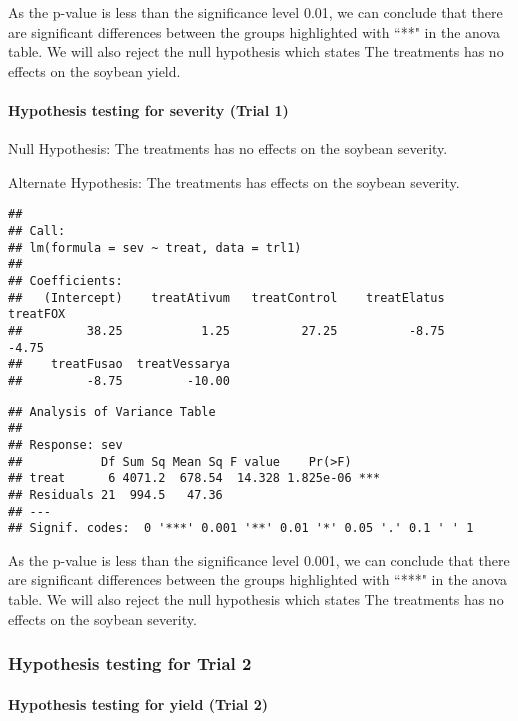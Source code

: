 \documentclass[
]{article}
\begin{document}
As the p-value is less than the significance level 0.01, we can conclude
that there are significant differences between the groups highlighted
with ``**" in the anova table. We will also reject the null hypothesis
which states The treatments has no effects on the soybean yield.

\hypertarget{hypothesis-testing-for-severity-trial-1}{%
\paragraph{Hypothesis testing for severity (Trial
1)}\label{hypothesis-testing-for-severity-trial-1}}

Null Hypothesis: The treatments has no effects on the soybean severity.

Alternate Hypothesis: The treatments has effects on the soybean
severity.

\begin{verbatim}
## 
## Call:
## lm(formula = sev ~ treat, data = trl1)
## 
## Coefficients:
##   (Intercept)    treatAtivum   treatControl    treatElatus       treatFOX  
##         38.25           1.25          27.25          -8.75          -4.75  
##    treatFusao  treatVessarya  
##         -8.75         -10.00
\end{verbatim}

\begin{verbatim}
## Analysis of Variance Table
## 
## Response: sev
##           Df Sum Sq Mean Sq F value    Pr(>F)    
## treat      6 4071.2  678.54  14.328 1.825e-06 ***
## Residuals 21  994.5   47.36                      
## ---
## Signif. codes:  0 '***' 0.001 '**' 0.01 '*' 0.05 '.' 0.1 ' ' 1
\end{verbatim}

As the p-value is less than the significance level 0.001, we can
conclude that there are significant differences between the groups
highlighted with ``***" in the anova table. We will also reject the null
hypothesis which states The treatments has no effects on the soybean
severity.

\hypertarget{hypothesis-testing-for-trial-2}{%
\subsubsection{Hypothesis testing for Trial
2}\label{hypothesis-testing-for-trial-2}}

\hypertarget{hypothesis-testing-for-yield-trial-2}{%
\paragraph{Hypothesis testing for yield (Trial
2)}\label{hypothesis-testing-for-yield-trial-2}}
\end{document}

